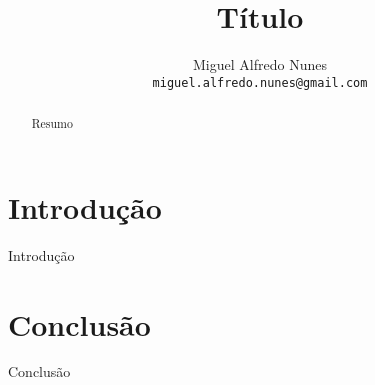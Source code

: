 \documentclass[a4paper, 12pt]{article}
\title{Título}
\author{Miguel Alfredo Nunes \\ \small{\texttt{miguel.alfredo.nunes@gmail.com}}}
\date{}
\begin{document}
	\maketitle

	\begin{abstract}
		Resumo
	\end{abstract}

	\section{Introdução}
		\label{sec:introducao}
		Introdução

	\section{Conclusão}
		\label{sec:conclusao}
		Conclusão

	
\end{document}
